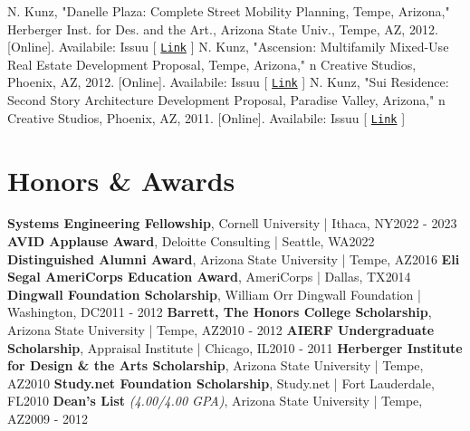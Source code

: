 \documentclass{article}
\begin{document}
        N. Kunz, "Danelle Plaza: Complete Street Mobility Planning, Tempe, Arizona," Herberger Inst. for Des. and the Art., Arizona State Univ., Tempe, AZ, 2012. [Online]. Availabile:\newline\newline
        \faBook\space Issuu [ \href{https://issuu.com/nickkunz/docs/danelle_plaza}{\texttt{Link}} ]\newline\newline
        N. Kunz, "Ascension: Multifamily Mixed-Use Real Estate Development Proposal, Tempe, Arizona," n Creative Studios, Phoenix, AZ, 2012. [Online]. Availabile:\newline\newline
        \faBook\space Issuu [ \href{https://issuu.com/nickkunz/docs/ascension}{\texttt{Link}} ]\newline\newline
        N. Kunz, "Sui Residence: Second Story Architecture Development Proposal, Paradise Valley, Arizona," n Creative Studios, Phoenix, AZ, 2011. [Online]. Availabile:\newline\newline
        \faBook\space Issuu [ \href{https://issuu.com/nickkunz/docs/sui}{\texttt{Link}} ]
\newpage
    \section*{Honors \& Awards}
        \textbf{Systems Engineering Fellowship}, Cornell University | Ithaca, NY\hfill{2022 - 2023}\newline
        \textbf{AVID Applause Award}, Deloitte Consulting | Seattle, WA\hfill{2022}\newline %
        \textbf{Distinguished Alumni Award}, Arizona State University | Tempe, AZ\hfill{2016}\newline
        \textbf{Eli Segal AmeriCorps Education Award}, AmeriCorps | Dallas, TX\hfill{2014}\newline
        \textbf{Dingwall Foundation Scholarship}, William Orr Dingwall Foundation | Washington, DC\hfill{2011 - 2012}\newline
        \textbf{Barrett, The Honors College Scholarship}, Arizona State University | Tempe, AZ\hfill{2010 - 2012}\newline
        \textbf{AIERF Undergraduate Scholarship}, Appraisal Institute | Chicago, IL\hfill{2010 - 2011}\newline
        \textbf{Herberger Institute for Design \& the Arts Scholarship}, Arizona State University | Tempe, AZ\hfill{2010}\newline
        \textbf{Study.net Foundation Scholarship}, Study.net | Fort Lauderdale, FL\hfill{2010}\newline
        \textbf{Dean's List} \textit{(4.00/4.00 GPA)}, Arizona State University | Tempe, AZ\hfill{2009 - 2012}
\end{document}
